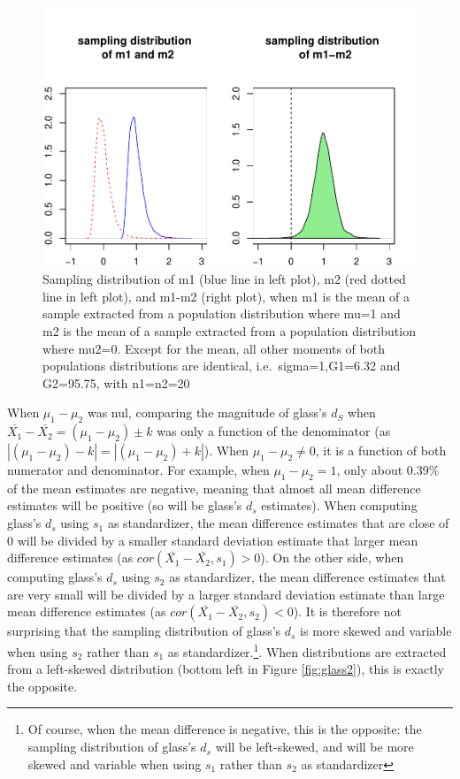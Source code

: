 \documentclass[
  man,floatsintext]{apa6}
\begin{document}
\begin{figure}
\centering
\includegraphics{Mathematical-study-of-Glass-s-d_files/figure-latex/sampldist4-1.pdf}
\caption{\label{fig:sampldist4}Sampling distribution of m1 (blue line in left plot), m2 (red dotted line in left plot), and m1-m2 (right plot), when m1 is the mean of a sample extracted from a population distribution where mu=1 and m2 is the mean of a sample extracted from a population distribution where mu2=0. Except for the mean, all other moments of both populations distributions are identical, i.e.~sigma=1,G1=6.32 and G2=95.75, with n1=n2=20}
\end{figure}

When \(\mu_1-\mu_2\) was nul, comparing the magnitude of glass's \(d_S\) when \(\bar{X_1}-\bar{X_2} = (\mu_1-\mu_2) \pm k\) was only a function of the denominator (as \(|(\mu_1-\mu_2)-k|=|(\mu_1-\mu_2)+k|\)). When \(\mu_1-\mu_2 \neq 0\), it is a function of both numerator and denominator. For example, when \(\mu_1-\mu_2=1\), only about 0.39\% of the mean estimates are negative, meaning that almost all mean difference estimates will be positive (so will be glass's \(d_s\) estimates). When computing glass's \(d_s\) using \(s_1\) as standardizer, the mean difference estimates that are close of 0 will be divided by a smaller standard deviation estimate that larger mean difference estimates (as \(cor(\bar{X_1}-\bar{X_2},s_1)>0\)). On the other side, when computing glass's \(d_s\) using \(s_2\) as standardizer, the mean difference estimates that are very small will be divided by a larger standard deviation estimate than large mean difference estimates (as \(cor(\bar{X_1}-\bar{X_2},s_2)<0\)). It is therefore not surprising that the sampling distribution of glass's \(d_s\) is more skewed and variable when using \(s_2\) rather than \(s_1\) as standardizer.\footnote{Of course, when the mean difference is negative, this is the opposite: the sampling distribution of glass's $d_s$ will be left-skewed, and will be more skewed and variable when using $s_1$ rather than $s_2$ as standardizer}. When distributions are extracted from a left-skewed distribution (bottom left in Figure \ref{fig:glass2}), this is exactly the opposite.
\end{document}
